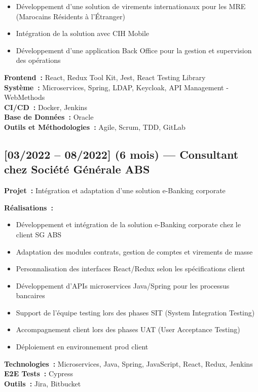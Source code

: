 \begin{itemize}
    \item Développement d'une solution de virements internationaux pour les MRE (Marocains Résidents à l'Étranger)
    \item Intégration de la solution avec CIH Mobile
    \item Développement d'une application Back Office pour la gestion et supervision des opérations
\end{itemize}

\textbf{Frontend~:} React, Redux Tool Kit, Jest, React Testing Library\\
\textbf{Système~:} Microservices, Spring, LDAP, Keycloak, API Management - WebMethods\\
\textbf{CI/CD~:} Docker, Jenkins\\
\textbf{Base de Données~:} Oracle\\
\textbf{Outils et Méthodologies~:} Agile, Scrum, TDD, GitLab

\subsection*{[03/2022 -- 08/2022] (6 mois) --- Consultant chez Société Générale ABS}
\vspace{4pt}
\textbf{Projet~:} Intégration et adaptation d'une solution e-Banking corporate

\textbf{Réalisations~:}
\begin{itemize}
    \item Développement et intégration de la solution e-Banking corporate chez le client SG ABS
    \item Adaptation des modules contrats, gestion de comptes et virements de masse
    \item Personnalisation des interfaces React/Redux selon les spécifications client
    \item Développement d'APIs microservices Java/Spring pour les processus bancaires
    \item Support de l'équipe testing lors des phases SIT (System Integration Testing)
    \item Accompagnement client lors des phases UAT (User Acceptance Testing)
    \item Déploiement en environnement prod client
\end{itemize}
\textbf{Technologies~:} Microservices, Java, Spring, JavaScript, React, Redux, Jenkins\\
\textbf{E2E Tests~:} Cypress\\
\textbf{Outils~:} Jira, Bitbucket

